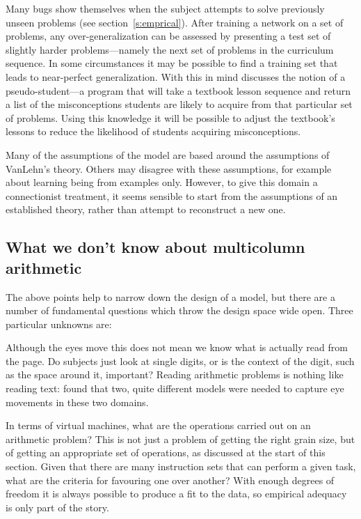  Many bugs show themselves when the
subject attempts to solve previously unseen problems (see
section~\ref{s:emprical}).  After training a network on a set of problems,
any over-generalization can be assessed by presenting a test set of slightly
harder problems---namely the next set of problems in the curriculum
sequence. In some circumstances it may be possible to find a training set
that leads to near-perfect generalization. With this in mind
 discusses the notion of a pseudo-student---a program that
will take a textbook lesson sequence and return a list of the
misconceptions students are likely to acquire from that particular set of
problems. Using this knowledge it will be possible to adjust the textbook's
lessons to reduce the likelihood of students acquiring misconceptions.

Many of the assumptions of the model are based around the assumptions of
VanLehn's theory.  Others may disagree with these assumptions, for example
about learning being from examples only. However, to give this domain a
connectionist treatment, it seems sensible to start from the assumptions of
an established theory, rather than attempt to reconstruct a new one.

\subsection{What we don't know about multicolumn arithmetic}

The above points help to narrow down the design of a model, but there
are a number of fundamental questions which throw the design space wide
open. Three particular unknowns are:

 Although the eyes move this does not mean we
know what is actually read from the page.  Do subjects just look at
single digits, or is the context of the digit, such as the space
around it, important?  Reading
arithmetic problems is nothing like reading text:  found
that two, quite different models were needed to capture eye movements in
these two domains.

 In terms of virtual machines, what are the
operations carried out on an arithmetic problem?  This is not just a
problem of getting the right grain size, but of getting an appropriate set
of operations, as discussed at the start of this section.  Given that
there are many instruction sets that can perform a given task, what are the
criteria for favouring one over another? With enough degrees of freedom it
is always possible to produce a fit to the data, so empirical adequacy is
only part of the story.

